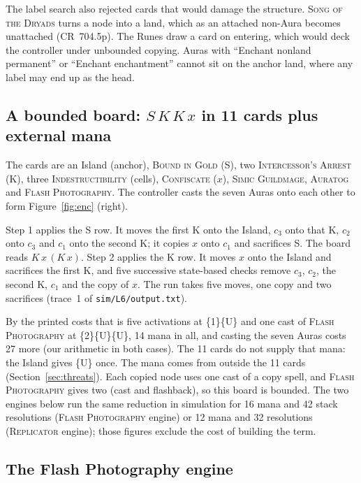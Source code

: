 \documentclass[11pt]{article}
\theoremstyle{definition}
\newcommand{\ms}[1]{\{#1\}}
\newcommand{\card}[1]{{\mdseries\scshape #1}}
\newcommand{\CR}[1]{CR~#1}
\begin{document}
The label search also rejected cards that would damage the structure.
\card{Song of the Dryads} turns a node into a land, which as an attached non-Aura becomes
unattached (\CR{704.5p}). The Runes draw a card on entering, which would deck the
controller under unbounded copying. Auras with ``Enchant nonland permanent'' or ``Enchant
enchantment'' cannot sit on the anchor land, where any label may end up as the head.

\subsection{\texorpdfstring{A bounded board: $S\,K\,K\,x$ in 11 cards plus external mana}{A bounded board: S K K x in 11 cards plus external mana}}

The cards are an Island (anchor), \card{Bound in Gold} (S), two \card{Intercessor's Arrest}
(K), three \card{Indestructibility} (cells), \card{Confiscate} ($x$), \card{Simic Guildmage},
\card{Auratog} and \card{Flash Photography}. The controller casts the seven Auras onto each
other to form Figure~\ref{fig:enc} (right).

Step 1 applies the S row. It moves the first K onto the Island, $c_3$ onto that K, $c_2$
onto $c_3$ and $c_1$ onto the second K; it copies $x$ onto $c_1$ and sacrifices S. The
board reads $K\,x\,(K\,x)$. Step 2 applies the K row. It moves $x$ onto the Island and
sacrifices the first K, and five successive state-based checks remove $c_3$, $c_2$, the
second K, $c_1$ and the copy of $x$. The run takes five moves, one copy and two sacrifices
(trace~1 of \texttt{sim/L6/output.txt}).

By the printed costs that is five activations at \ms{1}\ms{U} and one cast of \card{Flash
Photography} at \ms{2}\ms{U}\ms{U}, 14 mana in all, and casting the seven Auras costs 27
more (our arithmetic in both cases). The 11 cards do not supply that mana: the Island
gives \ms{U} once. The mana comes from outside the 11 cards
(Section~\ref{sec:threats}). Each copied node uses
one cast of a copy spell, and \card{Flash Photography} gives two (cast and flashback), so
this board is bounded. The two engines below run the same reduction in simulation for 16
mana and 42 stack resolutions (\card{Flash Photography} engine) or 12 mana and 32
resolutions (\card{Replicator} engine); those figures exclude the cost of building the
term.

\subsection{The Flash Photography engine}
\end{document}
